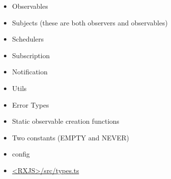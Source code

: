 \begin{itemize}
  \item Observables
  \item Subjects (these are both observers and observables)
  \item Schedulers
  \item Subscription
  \item Notification
  \item Utils
  \item Error Types
  \item Static observable creation functions
  \item Two constants (EMPTY and NEVER)
  \item config
\end{itemize}





\begin{itemize}
  \item \href{https://github.com/ReactiveX/rxjs/blob/master/src/internal/types.ts}
        {<RXJS>/src/types.ts}
\end{itemize}

